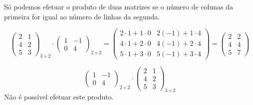 Só podemos efetuar o produto de duas matrizes se o número de colunas da primeira for igual ao número de linhas da segunda.

\begin{exemplo}
    \begin{equation*}
        \begin{pmatrix}
            2 & 1\\
            4 & 2\\
            5 & 3
        \end{pmatrix}
    _{3\times 2} \cdot
        \begin{pmatrix}
            1 & -1\\
            0 & 4
        \end{pmatrix}
    _{2\times 2} = 
        \begin{pmatrix}
            2\cdot 1+1\cdot 0 & 2(-1)+1\cdot 4\\
            4\cdot 1+2\cdot 0 & 4(-1)+2\cdot 4\\
            5\cdot 1+3\cdot 0 & 5(-1)+3\cdot 4
        \end{pmatrix}
     =  
        \begin{pmatrix}
            2 & 2\\
            4 & 4\\
            5 & 7
        \end{pmatrix}
    \end{equation*}
\end{exemplo}

\begin{exemplo}
    \begin{equation*}
        \begin{pmatrix}
            1 & -1\\
            0 & 4
        \end{pmatrix}
        _{2\times 2} \cdot
        \begin{pmatrix}
            2 & 1\\
            4 & 2\\
            5 & 3
        \end{pmatrix}
        _{3\times 2}
    \end{equation*}
    Não é possível efetuar este produto.
\end{exemplo}

